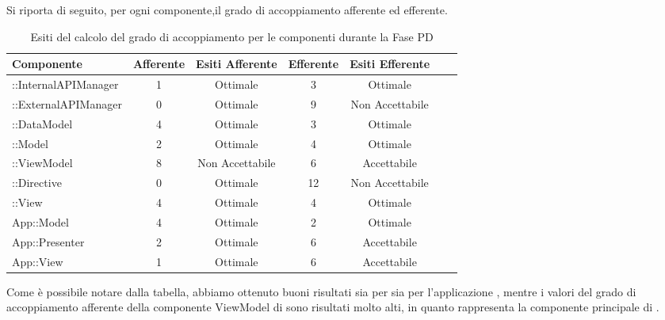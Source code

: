 			Si riporta di seguito, per ogni componente,il grado di accoppiamento afferente ed efferente.
			\begin{table}[H]
				\centering
					\begin{tabu}{| l | c | c | c | c | c | c | }
						\hline
						Componente					& Afferente & Esiti Afferente & Efferente & Esiti Efferente 	\\ \hline \hline
						::InternalAPIManager	& 1 & Ottimale & 3 & Ottimale  \\ \hline
						::ExternalAPIManager  & 0 & Ottimale & 9 & Non Accettabile   \\ \hline
						::DataModel  			& 4 & Ottimale & 3 & Ottimale   \\ \hline
						::Model 				& 2 & Ottimale & 4 & Ottimale   \\ \hline
						::ViewModel 			& 8 & Non Accettabile & 6 & Accettabile   \\ \hline
						::Directive 			& 0 & Ottimale & 12 & Non Accettabile   \\ \hline
						::View 				& 4 & Ottimale & 4 & Ottimale   \\ \hline
						App::Model 					& 4 & Ottimale & 2 & Ottimale   \\ \hline
						App::Presenter 				& 2 & Ottimale & 6 & Accettabile   \\ \hline
						App::View 					& 1 & Ottimale & 6 & Accettabile   \\ \hline
					\end{tabu}
				\caption{Esiti del calcolo del grado di accoppiamento per le componenti durante la Fase PD}
			\end{table}
			Come è possibile notare dalla tabella, abbiamo ottenuto buoni risultati sia per  sia per l'applicazione , mentre i valori del grado di accoppiamento afferente della componente ViewModel di  sono risultati molto alti, in quanto rappresenta la componente principale di .